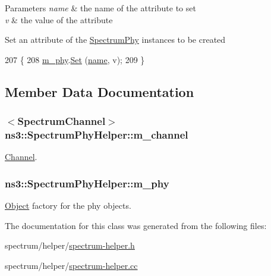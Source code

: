 \begin{DoxyParams}{Parameters}
{\em name} & the name of the attribute to set \\
\hline
{\em v} & the value of the attribute\\
\hline
\end{DoxyParams}
Set an attribute of the \hyperlink{classns3_1_1SpectrumPhy}{Spectrum\+Phy} instances to be created 
\begin{DoxyCode}
207 \{
208   \hyperlink{classns3_1_1SpectrumPhyHelper_a504a56c799e0a0cbfd751eac618f2a89}{m\_phy}.\hyperlink{classns3_1_1ObjectFactory_aef5c0d5019c96bdf01cefd1ff83f4a68}{Set} (\hyperlink{generate__test__data__lte__spectrum__model_8m_ab74e6bf80237ddc4109968cedc58c151}{name}, v);
209 \}
\end{DoxyCode}


\subsection{Member Data Documentation}
\subsubsection[{\texorpdfstring{m\+\_\+channel}{m_channel}}]{$<${\bf Spectrum\+Channel}$>$ ns3\+::\+Spectrum\+Phy\+Helper\+::m\+\_\+channel\hspace{0.3cm}{\ttfamily [private]}}\hypertarget{classns3_1_1SpectrumPhyHelper_a30f5f46f27867be2fdddf3dbfe1fd239}{}\label{classns3_1_1SpectrumPhyHelper_a30f5f46f27867be2fdddf3dbfe1fd239}


\hyperlink{classns3_1_1Channel}{Channel}. 

\subsubsection[{\texorpdfstring{m\+\_\+phy}{m_phy}}]{ ns3\+::\+Spectrum\+Phy\+Helper\+::m\+\_\+phy\hspace{0.3cm}{\ttfamily [private]}}\hypertarget{classns3_1_1SpectrumPhyHelper_a504a56c799e0a0cbfd751eac618f2a89}{}\label{classns3_1_1SpectrumPhyHelper_a504a56c799e0a0cbfd751eac618f2a89}


\hyperlink{classns3_1_1Object}{Object} factory for the phy objects. 



The documentation for this class was generated from the following files\+:\begin{DoxyCompactItemize}
\item 
spectrum/helper/\hyperlink{spectrum-helper_8h}{spectrum-\/helper.\+h}\item 
spectrum/helper/\hyperlink{spectrum-helper_8cc}{spectrum-\/helper.\+cc}\end{DoxyCompactItemize}

